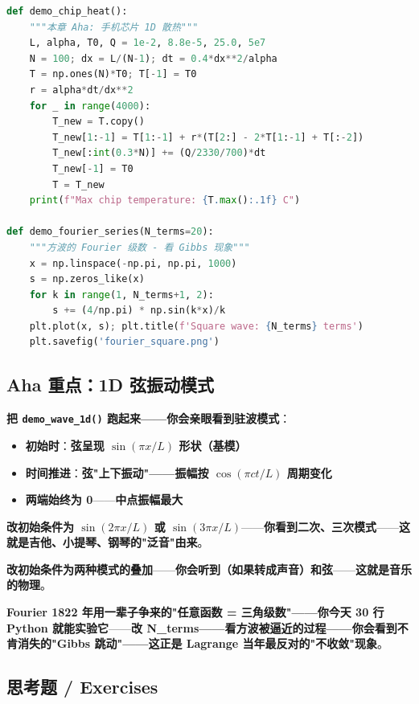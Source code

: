 \begin{lstlisting}[language=Python]
def demo_chip_heat():
    """本章 Aha: 手机芯片 1D 散热"""
    L, alpha, T0, Q = 1e-2, 8.8e-5, 25.0, 5e7
    N = 100; dx = L/(N-1); dt = 0.4*dx**2/alpha
    T = np.ones(N)*T0; T[-1] = T0
    r = alpha*dt/dx**2
    for _ in range(4000):
        T_new = T.copy()
        T_new[1:-1] = T[1:-1] + r*(T[2:] - 2*T[1:-1] + T[:-2])
        T_new[:int(0.3*N)] += (Q/2330/700)*dt
        T_new[-1] = T0
        T = T_new
    print(f"Max chip temperature: {T.max():.1f} C")

def demo_fourier_series(N_terms=20):
    """方波的 Fourier 级数 - 看 Gibbs 现象"""
    x = np.linspace(-np.pi, np.pi, 1000)
    s = np.zeros_like(x)
    for k in range(1, N_terms+1, 2):
        s += (4/np.pi) * np.sin(k*x)/k
    plt.plot(x, s); plt.title(f'Square wave: {N_terms} terms')
    plt.savefig('fourier_square.png')
\end{lstlisting}

\subsection{Aha 重点：1D 弦振动模式}

\textbf{把 \texttt{demo\_wave\_1d()} 跑起来——你会亲眼看到\textbf{驻波模式}}：

\begin{itemize}
\item \textbf{初始时}：\textbf{弦呈现 $\sin(\pi x / L)$ 形状（基模）}
\item \textbf{时间推进}：\textbf{弦"上下振动"——振幅按 $\cos(\pi c t / L)$ 周期变化}
\item \textbf{两端始终为 0}——\textbf{中点振幅最大}
\end{itemize}

\textbf{改初始条件为 $\sin(2\pi x/L)$ 或 $\sin(3\pi x/L)$}——\textbf{你看到\textbf{二次、三次模式}}——\textbf{这就是吉他、小提琴、钢琴的"泛音"由来}。

\textbf{改初始条件为\textbf{两种模式的叠加}}——\textbf{你会听到（如果转成声音）\textbf{和弦}}——\textbf{这就是音乐的物理}。

\textbf{Fourier 1822 年用一辈子争来的"任意函数 = 三角级数"——你今天 30 行 Python 就能实验它}——\textbf{改 N\_terms——看方波被逼近的过程——\textbf{你会看到不肯消失的"Gibbs 跳动"}——这正是 Lagrange 当年最反对的"不收敛"现象}。

\subsection{思考题 / Exercises}

